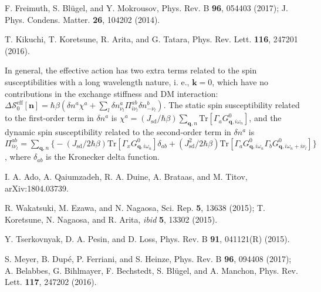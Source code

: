 \documentclass[aps,prl,twocolumn,amsmath,amssymb,superscriptaddress]{revtex4}%
\begin{document}
\begin{thebibliography}{9}
F. Freimuth, S. Bl\"{u}gel, and Y. Mokrousov, Phys. Rev. B \textbf{96}, 054403 (2017); J. Phys. Condens. Matter. \textbf{26}, 104202 (2014).

T. Kikuchi, T. Koretsune, R. Arita, and G. Tatara, Phys. Rev. Lett. \textbf{116}, 247201 (2016).

In general, the effective action has two extra terms related to the spin susceptibilities with a long wavelength nature, i. e., $\bm{k}=0$, which have no contributions in the exchange stiffness and DM interaction:
$\Delta \mathcal{S}^{\mathrm{eff}}_{0}[\bm{n}]=\hbar\beta\left(\delta n^a \chi^{a}+\sum_{l}\delta n^a_{\nu_l} \Pi^{ab}_{i\nu_l} \delta n^b_{-\nu_l}\right)$. The static spin susceptibility related to the first-order term in $\delta n^a$ is $\chi^{a}=(J_{\mathrm{sd}}/\hbar\beta)\sum_{\bm{q},n}\mathrm{Tr}[\Gamma_a G^0_{\bm{q},i\omega_{n}}]$, and the dynamic spin susceptibility related to the second-order term in $\delta n^a$ is
$\Pi^{ab}_{i\nu_l}=\sum_{\bm{q},n}\big\{-(J_{\mathrm{sd}}/2\hbar\beta)\mathrm{Tr}[\Gamma_x G^0_{\bm{q},i\omega_{n}}]\delta_{ab}+(J^2_{\mathrm{sd}}/2\hbar\beta)\mathrm{Tr}[\Gamma_a G^0_{\bm{q},i\omega_{n}}\Gamma_b G^0_{\bm{q},i\omega_{n}+i\nu_l}]\big\}$, where $\delta_{ab}$ is the Kronecker delta function.

I. A. Ado, A. Qaiumzadeh, R. A. Duine, A. Brataas, and M. Titov, arXiv:1804.03739.

R. Wakatsuki, M. Ezawa, and N. Nagaosa, Sci. Rep. \textbf{5}, 13638 (2015); T. Koretsune, N. Nagaosa, and R. Arita, \textit{ibid} \textbf{5}, 13302 (2015).

Y. Tserkovnyak, D. A. Pesin, and D. Loss, Phys. Rev. B \textbf{91}, 041121(R) (2015).


S. Meyer, B. Dup\'{e}, P. Ferriani, and S. Heinze, Phys. Rev. B \textbf{96}, 094408 (2017); A. Belabbes, G. Bihlmayer, F. Bechstedt, S. Bl\"{u}gel, and A. Manchon, Phys. Rev. Lett. \textbf{117}, 247202 (2016).





\end{thebibliography}
\end{document}
